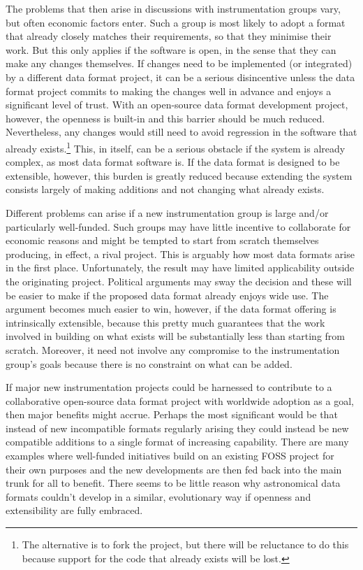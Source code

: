 \documentclass[final,authoryear,5p,times,twocolumn]{elsarticle}
\begin{document}
The problems that then arise in discussions with instrumentation
groups vary, but often economic factors enter. Such a group is most
likely to adopt a format that already closely matches their
requirements, so that they minimise their work. But this only applies
if the software is open, in the sense that they can make any changes
themselves. If changes need to be implemented (or integrated) by a
different data format project, it can be a serious disincentive unless
the data format project commits to making the changes well in advance
and enjoys a significant level of trust. With an open-source data
format development project, however, the openness is built-in and this
barrier should be much reduced. Nevertheless, any changes would still
need to avoid regression in the software that already
exists.\footnote{The alternative is to fork the project, but there
  will be reluctance to do this because support for the code that
  already exists will be lost.}  This, in itself, can be a serious
obstacle if the system is already complex, as most data format
software is. If the data format is designed to be extensible, however,
this burden is greatly reduced because extending the system consists
largely of making additions and not changing what already exists.

Different problems can arise if a new instrumentation group is large
and/or particularly well-funded. Such groups may have little incentive
to collaborate for economic reasons and might be tempted to start from
scratch themselves producing, in effect, a rival project. This is
arguably how most data formats arise in the first
place. Unfortunately, the result may have limited applicability
outside the originating project. Political arguments may sway the
decision and these will be easier to make if the proposed data format
already enjoys wide use. The argument becomes much easier to win,
however, if the data format offering is intrinsically extensible,
because this pretty much guarantees that the work involved in building
on what exists will be substantially less than starting from
scratch. Moreover, it need not involve any compromise to the
instrumentation group's goals because there is no constraint on what
can be added.

If major new instrumentation projects could be harnessed to contribute
to a collaborative open-source data format project with worldwide
adoption as a goal, then major benefits might accrue. Perhaps the most
significant would be that instead of new incompatible formats
regularly arising they could instead be new compatible additions to a
single format of increasing capability. There are many examples where
well-funded initiatives build on an existing FOSS project for their
own purposes and the new developments are then fed back into the main
trunk for all to benefit. There seems to be little reason why
astronomical data formats couldn't develop in a similar, evolutionary
way if openness and extensibility are fully embraced.
\end{document}
